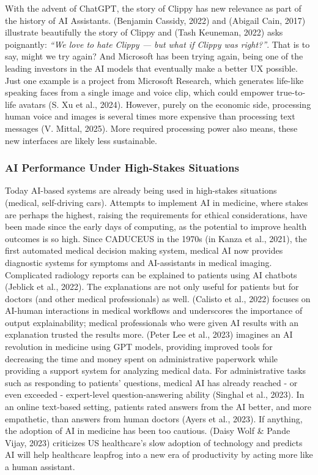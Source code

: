 \documentclass[
  12pt,
  letterpaper,
  DIV=11,
  numbers=noendperiod]{scrartcl}
\begin{document}
With the advent of ChatGPT, the story of Clippy has new relevance as
part of the history of AI Assistants. (Benjamin Cassidy, 2022) and
(Abigail Cain, 2017) illustrate beautifully the story of Clippy and
(Tash Keuneman, 2022) asks poignantly: \emph{``We love to hate Clippy
--- but what if Clippy was right?''}. That is to say, might we try
again? And Microsoft has been trying again, being one of the leading
investors in the AI models that eventually make a better UX possible.
Just one example is a project from Microsoft Research, which generates
life-like speaking faces from a single image and voice clip, which could
empower true-to-life avatars (S. Xu et al., 2024). However, purely on
the economic side, processing human voice and images is several times
more expensive than processing text messages (V. Mittal, 2025). More
required processing power also means, these new interfaces are likely
less sustainable.

\subsubsection{AI Performance Under High-Stakes
Situations}\label{ai-performance-under-high-stakes-situations}

Today AI-based systems are already being used in high-stakes situations
(medical, self-driving cars). Attempts to implement AI in medicine,
where stakes are perhaps the highest, raising the requirements for
ethical considerations, have been made since the early days of
computing, as the potential to improve health outcomes is so high. Since
CADUCEUS in the 1970s (in Kanza et al., 2021), the first automated
medical decision making system, medical AI now provides diagnostic
systems for symptoms and AI-assistants in medical imaging. Complicated
radiology reports can be explained to patients using AI chatbots
(Jeblick et al., 2022). The explanations are not only useful for
patients but for doctors (and other medical professionals) as well.
(Calisto et al., 2022) focuses on AI-human interactions in medical
workflows and underscores the importance of output explainability;
medical professionals who were given AI results with an explanation
trusted the results more. (Peter Lee et al., 2023) imagines an AI
revolution in medicine using GPT models, providing improved tools for
decreasing the time and money spent on administrative paperwork while
providing a support system for analyzing medical data. For
administrative tasks such as responding to patients' questions, medical
AI has already reached - or even exceeded - expert-level
question-answering ability (Singhal et al., 2023). In an online
text-based setting, patients rated answers from the AI better, and more
empathetic, than answers from human doctors (Ayers et al., 2023). If
anything, the adoption of AI in medicine has been too cautious. (Daisy
Wolf \& Pande Vijay, 2023) criticizes US healthcare's slow adoption of
technology and predicts AI will help healthcare leapfrog into a new era
of productivity by acting more like a human assistant.
\end{document}
